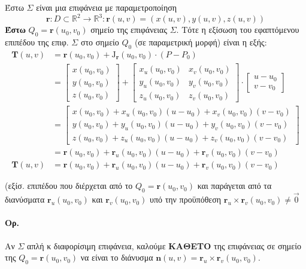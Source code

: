 \documentclass[11pt,a4paper,titlepage]{article}
\begin{document}
Έστω \( \varSigma \) είναι μια  επιφάνεια με παραμετροποίηση
\[
\mathbf r:D \subset \mathbb R ^2 \to \mathbb R ^ 3 : \mathbf r(u,v)=\left(x(u,v),y(u,v),z(u,v)\right)
\]
\textbf{Έστω} \( Q_0  = \mathbf{r}(u_0,v_0) \) σημείο της επιφάνειας \( \varSigma \).
Τότε η εξίσωση του εφαπτόμενου επιπέδου της επιφ. \( \varSigma \) στο σημείο \( Q_0 \) (σε παραμετρική μορφή)
είναι η εξής:
\begin{align*}
\mathbf T(u,v) &= \mathbf{r}(u_0,v_0)+\mathrm J_{\mathbf r}(u_0,v_0)\cdot(P-P_0)
\\ &= \left[\begin{matrix}
x(u_0,v_0) \\ y(u_0,v_0) \\ z(u_0,v_0)
\end{matrix}\right] + \left[ \begin{matrix}
x_u(u_0,v_0) & x_v(u_0,v_0) \\
y_u(u_0,v_0) & y_v(u_0,v_0) \\
z_u(u_0,v_0) & z_v(u_0,v_0)
\end{matrix} \right] \cdot \left[ \begin{matrix}
u-u_0 \\ v-v_0
\end{matrix} \right]
\\ &= \left[\begin{matrix}
x(u_0,v_0)+x_u(u_0,v_0)(u-u_0)+x_v(u_0,v_0)(v-v_0) \\
y(u_0,v_0)+y_u(u_0,v_0)(u-u_0)+y_v(u_0,v_0)(v-v_0) \\
z(u_0,v_0)+z_u(u_0,v_0)(u-u_0)+z_v(u_0,v_0)(v-v_0)
\end{matrix} \right]
\\ &= \mathbf r(u_0,v_0) + \mathbf r_u(u_0,v_0)(u-u_0) + \mathbf r_v(u_0,v_0)(v-v_0) \\
\mathbf T(u,v) &= \mathbf r(u_0,v_0) + \mathbf r_u(u_0,v_0)(u-u_0) + \mathbf r_v(u_0,v_0)(v-v_0)
\end{align*}

(εξίσ. επιπέδου που διέρχεται από το \( Q_0=\mathbf r(u_0,v_0) \) και παράγεται από τα διανύσματα \( \mathbf r_u(u_0,v_0) \) και \( \mathbf r_v(u_0,v_0) \) υπό την προϋπόθεση \( \mathbf r_u \times \mathbf r_v(u_0,v_0) \neq \vec 0 \)

\paragraph{Ορ.}
Αν \( \varSigma \) απλή κ διαφορίσιμη επιφάνεια, καλούμε \textbf{ΚΑΘΕΤΟ} της επιφάνειας σε σημείο της \( Q_0 = \mathbf r(u_0,v_0) \) να είναι το διάνυσμα \( \mathbf n(u,v) = \mathbf r_u \times \mathbf r_v(u_0,v_0) \).
\end{document}
